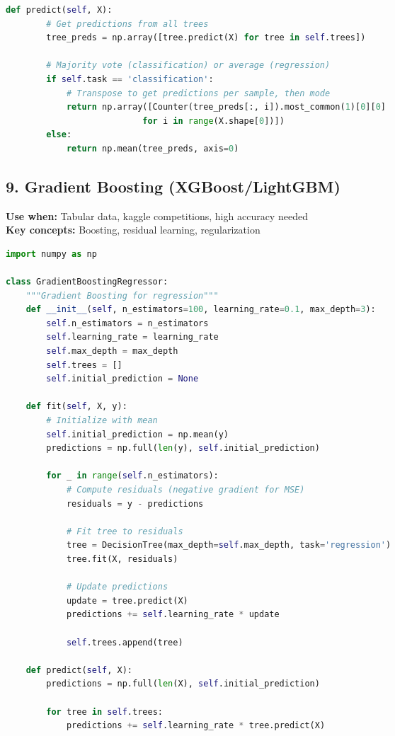 \documentclass[8pt,landscape]{article}
\begin{document}
\begin{multicols}{3}
\begin{lstlisting}[language=Python]
    def predict(self, X):
        # Get predictions from all trees
        tree_preds = np.array([tree.predict(X) for tree in self.trees])

        # Majority vote (classification) or average (regression)
        if self.task == 'classification':
            # Transpose to get predictions per sample, then mode
            return np.array([Counter(tree_preds[:, i]).most_common(1)[0][0]
                           for i in range(X.shape[0])])
        else:
            return np.mean(tree_preds, axis=0)
\end{lstlisting}

\subsection*{9. Gradient Boosting (XGBoost/LightGBM)}
\textbf{Use when:} Tabular data, kaggle competitions, high accuracy needed \\
\textbf{Key concepts:} Boosting, residual learning, regularization
\begin{lstlisting}[language=Python]
import numpy as np

class GradientBoostingRegressor:
    """Gradient Boosting for regression"""
    def __init__(self, n_estimators=100, learning_rate=0.1, max_depth=3):
        self.n_estimators = n_estimators
        self.learning_rate = learning_rate
        self.max_depth = max_depth
        self.trees = []
        self.initial_prediction = None

    def fit(self, X, y):
        # Initialize with mean
        self.initial_prediction = np.mean(y)
        predictions = np.full(len(y), self.initial_prediction)

        for _ in range(self.n_estimators):
            # Compute residuals (negative gradient for MSE)
            residuals = y - predictions

            # Fit tree to residuals
            tree = DecisionTree(max_depth=self.max_depth, task='regression')
            tree.fit(X, residuals)

            # Update predictions
            update = tree.predict(X)
            predictions += self.learning_rate * update

            self.trees.append(tree)

    def predict(self, X):
        predictions = np.full(len(X), self.initial_prediction)

        for tree in self.trees:
            predictions += self.learning_rate * tree.predict(X)


\end{lstlisting}
\end{multicols}
\end{document}
